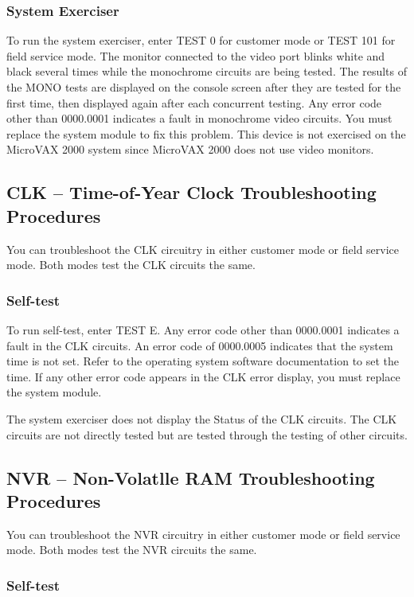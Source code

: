 \subsubsection{System Exerciser}

To run the system exerciser, enter TEST 0 for customer mode or TEST 101
for field service mode. The monitor connected to the video port blinks white
and black several times while the monochrome circuits are being tested. The
results of the MONO tests are displayed on the console screen after they are
tested for the first time, then displayed again after each concurrent testing.
Any error code other than 0000.0001 indicates a fault in monochrome video
circuits. You must replace the system module to fix this problem. This
device is not exercised on the MicroVAX 2000 system since MicroVAX 2000
does not use video monitors.

\subsection{CLK -- Time-of-Year Clock Troubleshooting Procedures}

You can troubleshoot the CLK circuitry in either customer mode or field
service mode. Both modes test the CLK circuits the same.

\subsubsection{Self-test}

To run self-test, enter TEST E. Any error code other than 0000.0001 
indicates a fault in the CLK circuits. An error code of 0000.0005 indicates that
the system time is not set. Refer to the operating system software 
documentation to set the time. If any other error code appears in the CLK error
display, you must replace the system module.

The system exerciser does not display the Status of the CLK circuits. The
CLK circuits are not directly tested but are tested through the testing of
other circuits.

\subsection{NVR -- Non-Volatlle RAM Troubleshooting Procedures}

You can troubleshoot the NVR circuitry in either customer mode or field
service mode. Both modes test the NVR circuits the same.

\subsubsection{Self-test}

